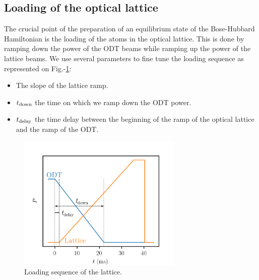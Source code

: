 \subsection{Loading of the optical lattice}

\label{sec:loading_lattice}

The crucial point of the preparation of an equilibrium state of the Bose-Hubbard Hamiltonian is the loading of the atoms in the optical lattice. This is done by ramping down the power of the ODT beams while ramping up the power of the lattice beams. We use several parameters to fine tune the loading sequence as represented on Fig.-\ref{fig:loading}:

\begin{itemize}
    \item The slope of the lattice ramp.
    \item $t_{\rm{down}}$ the time on which we ramp down the ODT power.
    \item $t_{\rm{delay}}$ the time delay between the beginning of the ramp of the optical lattice and the ramp of the ODT.
\end{itemize}

\begin{figure}
    \centering
    \includegraphics[width=0.7\textwidth]{Fig/Chapter3/loading_good.png}
    \caption{Loading sequence of the lattice.}
    \label{fig:loading}
\end{figure}

